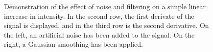 \documentclass[
  digital,     %
  oneside,     %
  nosansbold,  %
  nocolorbold, %
  lof,         %
  lot,         %
]{fithesis4}
\begin{document}
\begin{figure}
    \begin{subfigure}[t]{0.48\textwidth}
    \end{subfigure}
    \begin{subfigure}[t]{0.48\textwidth}
    \end{subfigure}
    \caption{Demonstration of the effect of noise and filtering on a simple
    linear increase in intensity. In the second row, the first derivate of the
    signal is displayed, and in the third row is the second derivative. On the
    left, an artificial noise has been added to the signal. On the right, a
    Gaussian smoothing has been applied.}
    \label{fig:filtering-noise}
\end{figure}
\end{document}
